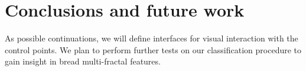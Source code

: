 \documentclass[final,5p,times]{elsarticle}
\begin{document}
\section{Conclusions and future work}

As possible continuations, we will define interfaces for visual interaction with the control points. We plan to perform further tests on our classification procedure to gain insight in bread multi-fractal features.














\end{document}

